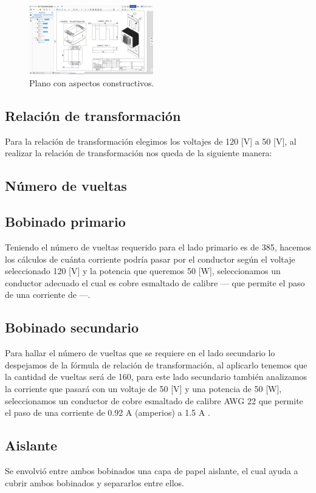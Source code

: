 \begin{figure}[ht!]
    \centering
    \includegraphics[width=0.48\textwidth]{fot/T1.png}
    \caption{Plano con aspectos constructivos.}
    \label{fig:T1}
\end{figure}



\subsection{Relación de transformación}
Para la relación de transformación elegimos los voltajes de 120 [V] a 50 [V], al realizar la relación de transformación nos queda de la siguiente manera: 

\subsection{Número de vueltas}
\subsection{Bobinado primario}
Teniendo el número de vueltas requerido para el lado primario es de 385, hacemos los cálculos de cuánta corriente podría pasar por el conductor según el voltaje seleccionado 120 [V] y la potencia que queremos 50 [W], seleccionamos un conductor adecuado el cual es cobre esmaltado de calibre --- que permite el paso de una corriente de ---.

\subsection{Bobinado secundario}
Para hallar el número de vueltas que se requiere en el lado secundario lo despejamos de la fórmula de relación de transformación, al aplicarlo tenemos que la cantidad de vueltas será de 160, para este lado secundario también analizamos la corriente que pasará con un voltaje de 50 [V] y una potencia de 50 [W], seleccionamos un conductor de cobre esmaltado de calibre AWG 22 que permite el paso de una corriente de 0.92 A (amperios) a 1.5 A .

\subsection{Aislante}
Se envolvió entre ambos bobinados una capa de papel aislante, el cual ayuda a cubrir ambos bobinados y separarlos entre ellos.

